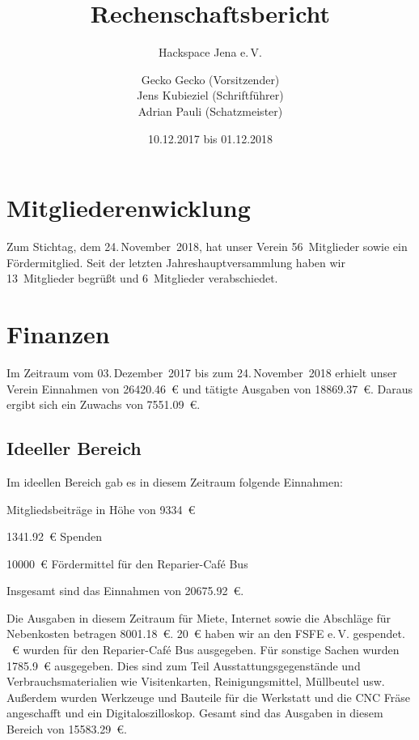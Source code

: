 \documentclass[ngerman]{scrartcl}
\title{Rechenschaftsbericht}
\subtitle{Hackspace Jena e.\,V.}
\author{%
	Gecko Gecko (Vorsitzender)\\
	Jens Kubieziel (Schriftführer)\\
	Adrian Pauli (Schatzmeister)
}
\date{10.12.2017 bis 01.12.2018}
\begin{document}
\maketitle{}

\tableofcontents{}

\newpage{}

\section{Mitgliederenwicklung}

Zum Stichtag, dem 24.\,November~2018, hat unser Verein 56~Mitglieder sowie ein Fördermitglied.
Seit der letzten Jahreshauptversammlung haben wir 13~Mitglieder begrüßt und 6~Mitglieder verabschiedet.

\section{Finanzen}

Im Zeitraum vom 03.\,Dezember~2017 bis zum 24.\,November~2018 erhielt unser Verein Einnahmen von \num{26420,46}~\euro{} und tätigte Ausgaben von \num{18869,37}~\euro{}.
Daraus ergibt sich ein Zuwachs von \num{7551,09}~\euro{}.


\subsection{Ideeller Bereich}
\label{sec:ideeller_bereich}

Im ideellen Bereich gab es in diesem Zeitraum folgende Einnahmen:
\begin{compactitem}
\item Mitgliedsbeiträge in Höhe von \num{9334}~\euro{}
\item \num{1341,92}~\euro{} Spenden
\item \num{10000}~\euro{} Fördermittel für den Reparier-Café Bus
\end{compactitem}
Insgesamt sind das Einnahmen von \num{20675,92}~\euro{}.

Die Ausgaben in diesem Zeitraum für Miete, Internet sowie die Abschläge für Nebenkosten betragen \num{8001,18}~\euro{}.
\num{20}~\euro{} haben wir an den FSFE e.\,V. gespendet.
~\euro{} wurden für den Reparier-Café Bus ausgegeben.
Für sonstige Sachen wurden \num{1785,9}~\euro{} ausgegeben.
Dies sind zum Teil Ausstattungsgegenstände und Verbrauchsmaterialien wie Visitenkarten, Reinigungsmittel, Müllbeutel usw.
Außerdem wurden Werkzeuge und Bauteile für die Werkstatt und die CNC Fräse angeschafft und ein Digitaloszilloskop.
Gesamt sind das Ausgaben in diesem Bereich von \num{15583,29}~\euro{}.
\end{document}

